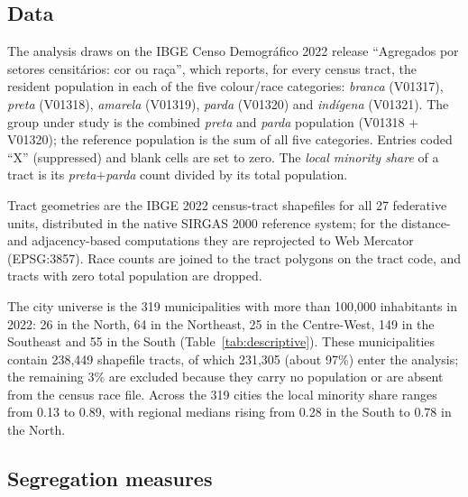 \documentclass[12pt,a4paper]{article}
\begin{document}
\subsection{Data}\label{subsec:data}

The analysis draws on the IBGE Censo Demogr\'afico 2022 release ``Agregados por setores censit\'arios: cor ou ra\c{c}a'', which reports, for every census tract, the resident population in each of the five colour/race categories: \emph{branca} (V01317), \emph{preta} (V01318), \emph{amarela} (V01319), \emph{parda} (V01320) and \emph{ind\'igena} (V01321). The group under study is the combined \emph{preta} and \emph{parda} population (V01318 $+$ V01320); the reference population is the sum of all five categories. Entries coded ``X'' (suppressed) and blank cells are set to zero. The \emph{local minority share} of a tract is its \emph{preta}$+$\emph{parda} count divided by its total population.

Tract geometries are the IBGE 2022 census-tract shapefiles for all 27 federative units, distributed in the native SIRGAS 2000 reference system; for the distance- and adjacency-based computations they are reprojected to Web Mercator (EPSG:3857). Race counts are joined to the tract polygons on the tract code, and tracts with zero total population are dropped.

The city universe is the 319 municipalities with more than 100{,}000 inhabitants in 2022: 26 in the North, 64 in the Northeast, 25 in the Centre-West, 149 in the Southeast and 55 in the South (Table~\ref{tab:descriptive}). These municipalities contain 238{,}449 shapefile tracts, of which 231{,}305 (about 97\%) enter the analysis; the remaining 3\% are excluded because they carry no population or are absent from the census race file. Across the 319 cities the local minority share ranges from 0.13 to 0.89, with regional medians rising from 0.28 in the South to 0.78 in the North.



\subsection{Segregation measures}\label{subsec:measures}
\end{document}
